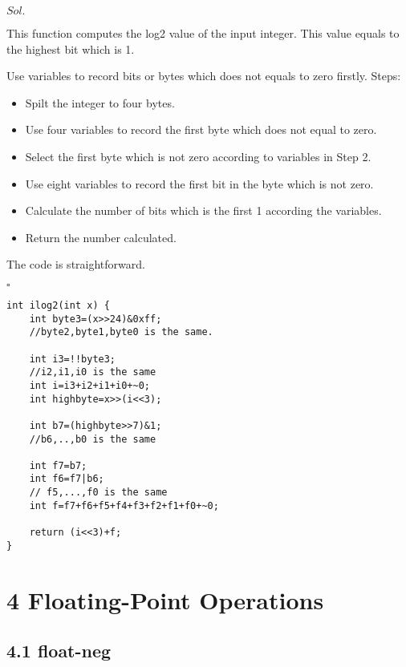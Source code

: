 \documentclass[a4paper, 11pt]{article}
\newenvironment{sol}[1] {\par \noindent $#1.$} {\par \hfill $\square$}
\begin{document}
\begin{sol}{Sol}

This function computes the log2 value of the input integer. This value equals to the highest bit which is 1.

Use variables to record bits or bytes which does not equals to zero firstly. Steps:
\begin{itemize}
    \item Spilt the integer to four bytes.
    \item Use four variables to record the first byte which does not equal to zero.
    \item Select the first byte which is not zero according to variables in Step 2.
    \item Use eight variables to record the first bit in the byte which is not zero.
    \item Calculate the number of bits which is the first 1 according the variables.
    \item Return the number calculated.
\end{itemize}

The code is straightforward.
\end{sol}
\begin{lstlisting}
int ilog2(int x) {
    int byte3=(x>>24)&0xff;
    //byte2,byte1,byte0 is the same.

    int i3=!!byte3;
    //i2,i1,i0 is the same
    int i=i3+i2+i1+i0+~0;
    int highbyte=x>>(i<<3);

    int b7=(highbyte>>7)&1;
    //b6,..,b0 is the same

    int f7=b7;
    int f6=f7|b6;
    // f5,...,f0 is the same
    int f=f7+f6+f5+f4+f3+f2+f1+f0+~0;

    return (i<<3)+f;
}
\end{lstlisting}

\section*{4 Floating-Point Operations}

\subsection*{4.1 float-neg}
\end{document}
